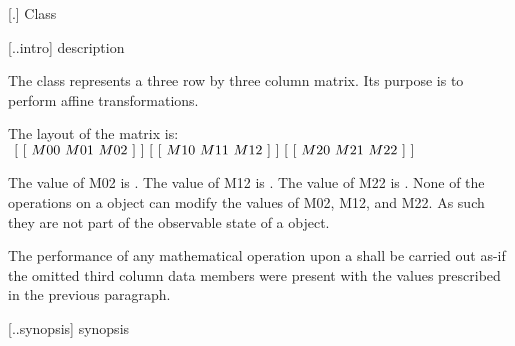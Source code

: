  [\iotwod.\matrixtwod] {Class }

 [\iotwod.\matrixtwod.intro] { description}

%
\pnum
The  class represents a three row by three column matrix. Its purpose is to perform affine transformations.

\pnum
The layout of the matrix is: \\
$
~[~[~M00~M01~M02~]~] \\
~[~[~M10~M11~M12~]~] \\
~[~[~M20~M21~M22~]~]$

\pnum
The value of M02 is . The value of M12 is . The value of M22 is . None of the operations on a  object can modify the values of M02, M12, and M22. As such they are not part of the observable state of a  object.

\pnum
The performance of any mathematical operation upon a  shall be carried out as-if the omitted third column data members were present with the values prescribed in the previous paragraph.

 [\iotwod.\matrixtwod.synopsis] { synopsis}

